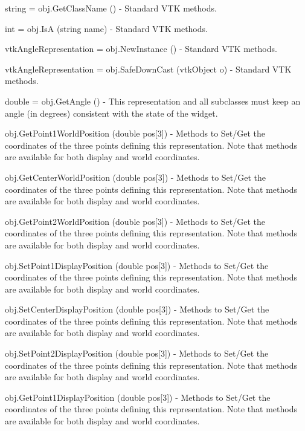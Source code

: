 \begin{DoxyItemize}
\item {\ttfamily string = obj.\-Get\-Class\-Name ()} -\/ Standard V\-T\-K methods.  
\item {\ttfamily int = obj.\-Is\-A (string name)} -\/ Standard V\-T\-K methods.  
\item {\ttfamily vtk\-Angle\-Representation = obj.\-New\-Instance ()} -\/ Standard V\-T\-K methods.  
\item {\ttfamily vtk\-Angle\-Representation = obj.\-Safe\-Down\-Cast (vtk\-Object o)} -\/ Standard V\-T\-K methods.  
\item {\ttfamily double = obj.\-Get\-Angle ()} -\/ This representation and all subclasses must keep an angle (in degrees) consistent with the state of the widget.  
\item {\ttfamily obj.\-Get\-Point1\-World\-Position (double pos\mbox{[}3\mbox{]})} -\/ Methods to Set/\-Get the coordinates of the three points defining this representation. Note that methods are available for both display and world coordinates.  
\item {\ttfamily obj.\-Get\-Center\-World\-Position (double pos\mbox{[}3\mbox{]})} -\/ Methods to Set/\-Get the coordinates of the three points defining this representation. Note that methods are available for both display and world coordinates.  
\item {\ttfamily obj.\-Get\-Point2\-World\-Position (double pos\mbox{[}3\mbox{]})} -\/ Methods to Set/\-Get the coordinates of the three points defining this representation. Note that methods are available for both display and world coordinates.  
\item {\ttfamily obj.\-Set\-Point1\-Display\-Position (double pos\mbox{[}3\mbox{]})} -\/ Methods to Set/\-Get the coordinates of the three points defining this representation. Note that methods are available for both display and world coordinates.  
\item {\ttfamily obj.\-Set\-Center\-Display\-Position (double pos\mbox{[}3\mbox{]})} -\/ Methods to Set/\-Get the coordinates of the three points defining this representation. Note that methods are available for both display and world coordinates.  
\item {\ttfamily obj.\-Set\-Point2\-Display\-Position (double pos\mbox{[}3\mbox{]})} -\/ Methods to Set/\-Get the coordinates of the three points defining this representation. Note that methods are available for both display and world coordinates.  
\item {\ttfamily obj.\-Get\-Point1\-Display\-Position (double pos\mbox{[}3\mbox{]})} -\/ Methods to Set/\-Get the coordinates of the three points defining this representation. Note that methods are available for both display and world coordinates.  

\end{DoxyItemize}
